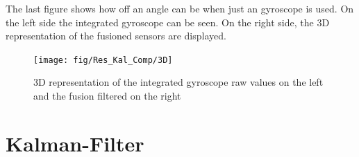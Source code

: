 The last figure shows how off an angle can be when just an gyroscope is used. On the left side the integrated gyroscope can be seen. On the right side, the 3D representation of the fusioned sensors are displayed.
\begin{figure}[H]
	\centering\texttt{[image: fig/Res\_Kal\_Comp/3D]}
	\caption[3D representation of Complementary-filtered IMU-Data in MATLAB]{3D representation of the integrated gyroscope raw values on the left and the fusion filtered on the right}
	\label{fig:3D}
\end{figure}


\section{Kalman-Filter}
\label{sec:KalmanFilterResult}


